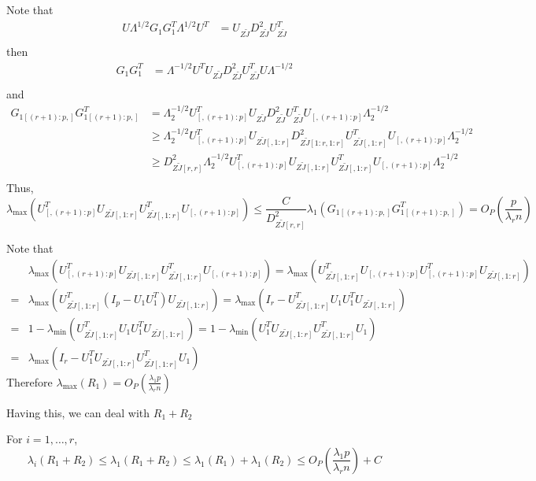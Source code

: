 \documentclass[review]{elsarticle}
\theoremstyle{plain}
\theoremstyle{definition}
\theoremstyle{remark}
\begin{document}
Note that
$$
\begin{aligned}
U\Lambda^{1/2} G_1 G_1^T \Lambda^{1/2} U^T 
    &=U_{Z\tilde{J}}D_{Z\tilde{J}}^2 U_{Z\tilde{J}}^T\\
\end{aligned}
$$
then
$$
\begin{aligned}
G_1 G_1^T  
    &=\Lambda^{-1/2} U^T U_{Z\tilde{J}}D_{Z\tilde{J}}^2 U_{Z\tilde{J}}^TU\Lambda^{-1/2}\\
\end{aligned}
$$
and
$$
\begin{aligned}
    G_{1[(r+1):p,]} G_{1[(r+1):p,]}^T  
    &=\Lambda_{2}^{-1/2} U_{[,(r+1):p]}^T U_{Z\tilde{J}}D_{Z\tilde{J}}^2 U_{Z\tilde{J}}^T U_{[,(r+1):p]}\Lambda_{2}^{-1/2}\\
    &\geq
    \Lambda_{2}^{-1/2} U_{[,(r+1):p]}^T U_{Z\tilde{J}[,1:r]}D_{Z\tilde{J}[1:r,1:r]}^2 U_{Z\tilde{J}[,1:r]}^T U_{[,(r+1):p]}\Lambda_{2}^{-1/2}\\
    &\geq
    D_{Z\tilde{J}[r,r]}^2
    \Lambda_{2}^{-1/2} U_{[,(r+1):p]}^T U_{Z\tilde{J}[,1:r]} U_{Z\tilde{J}[,1:r]}^T U_{[,(r+1):p]}\Lambda_{2}^{-1/2}\\
\end{aligned}
$$
Thus,
$$
\lambda_{\max}(U_{[,(r+1):p]}^T U_{Z\tilde{J}[,1:r]} U_{Z\tilde{J}[,1:r]}^T U_{[,(r+1):p]})\leq 
\frac{C}{D^2_{Z\tilde{J}[r,r]}} \lambda_{1}
    (G_{1[(r+1):p,]} G_{1[(r+1):p,]}^T)
=O_P(\frac{p}{\lambda_r n})
$$

Note that
$$
\begin{aligned}
    &\lambda_{\max}(U_{[,(r+1):p]}^T U_{Z\tilde{J}[,1:r]} U_{Z\tilde{J}[,1:r]}^T U_{[,(r+1):p]})
=
\lambda_{\max}( U_{Z\tilde{J}[,1:r]}^T U_{[,(r+1):p]}U_{[,(r+1):p]}^T U_{Z\tilde{J}[,1:r]})\\
    =&
    \lambda_{\max}( U_{Z\tilde{J}[,1:r]}^T (I_p- U_1 U_1^T) U_{Z\tilde{J}[,1:r]})=
    \lambda_{\max}(I_r- U_{Z\tilde{J}[,1:r]}^T  U_1 U_1^T U_{Z\tilde{J}[,1:r]})\\
    =&
    1-\lambda_{\min}( U_{Z\tilde{J}[,1:r]}^T  U_1 U_1^T U_{Z\tilde{J}[,1:r]})
    =
    1-\lambda_{\min}(U_1^T U_{Z\tilde{J}[,1:r]}U_{Z\tilde{J}[,1:r]}^T U_1)\\
    =&
    \lambda_{\max}(I_r-U_1^T U_{Z\tilde{J}[,1:r]}U_{Z\tilde{J}[,1:r]}^T U_1)
\end{aligned}
$$
Therefore $\lambda_{\max}(R_1)=O_P(\frac{\lambda_1 p}{\lambda_r n})$

Having this, we can deal with $R_1+R_2$

For $i=1,\ldots, r$,
$$
\lambda_i(R_1+R_2)\leq
\lambda_1(R_1+R_2)\leq \lambda_1(R_1)+\lambda_1(R_2)\leq O_P(\frac{\lambda_1 p}{\lambda_r n}) + C
$$
\end{document}
